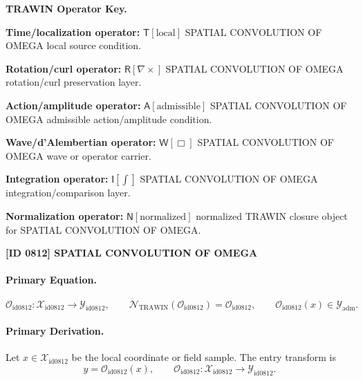 \par\vspace{0.45\baselineskip}
\noindent\begin{minipage}[t]{\linewidth}
\begingroup
\small
\raggedright
\textbf{TRAWIN Operator Key.}\par
\noindent\textbf{Time/localization operator:} $\mathsf{T}\!\left[\mathrm{local}\right]$ SPATIAL CONVOLUTION OF OMEGA local source condition.\par
\noindent\textbf{Rotation/curl operator:} $\mathsf{R}\!\left[\nabla\times\right]$ SPATIAL CONVOLUTION OF OMEGA rotation/curl preservation layer.\par
\noindent\textbf{Action/amplitude operator:} $\mathsf{A}\!\left[\mathrm{admissible}\right]$ SPATIAL CONVOLUTION OF OMEGA admissible action/amplitude condition.\par
\noindent\textbf{Wave/d'Alembertian operator:} $\mathsf{W}\!\left[\Box\right]$ SPATIAL CONVOLUTION OF OMEGA wave or operator carrier.\par
\noindent\textbf{Integration operator:} $\mathsf{I}\!\left[\int\right]$ SPATIAL CONVOLUTION OF OMEGA integration/comparison layer.\par
\noindent\textbf{Normalization operator:} $\mathsf{N}\!\left[\mathrm{normalized}\right]$ normalized TRAWIN closure object for SPATIAL CONVOLUTION OF OMEGA.\par
\endgroup
\end{minipage}

\clearpage
\noindent\textbf{[ID 0812] SPATIAL CONVOLUTION OF OMEGA}\par
\vspace{0.35em}
\paragraph{Primary Equation.}
\[
\mathcal{O}_{\mathrm{id0812}}:\mathcal{X}_{\mathrm{id0812}}\longrightarrow \mathcal{Y}_{\mathrm{id0812}},\qquad
\mathcal{N}_{\mathrm{TRAWIN}}(\mathcal{O}_{\mathrm{id0812}})=\mathcal{O}_{\mathrm{id0812}},\qquad
\mathcal{O}_{\mathrm{id0812}}(x)\in\mathcal{Y}_{\mathrm{adm}}.
\]

\paragraph{Primary Derivation.} Let $x\in \mathcal{X}_{\mathrm{id0812}}$ be the local coordinate or field sample.  The entry transform is\[
y=\mathcal{O}_{\mathrm{id0812}}(x),\qquad \mathcal{O}_{\mathrm{id0812}}:\mathcal{X}_{\mathrm{id0812}}\longrightarrow \mathcal{Y}_{\mathrm{id0812}}.
\]

